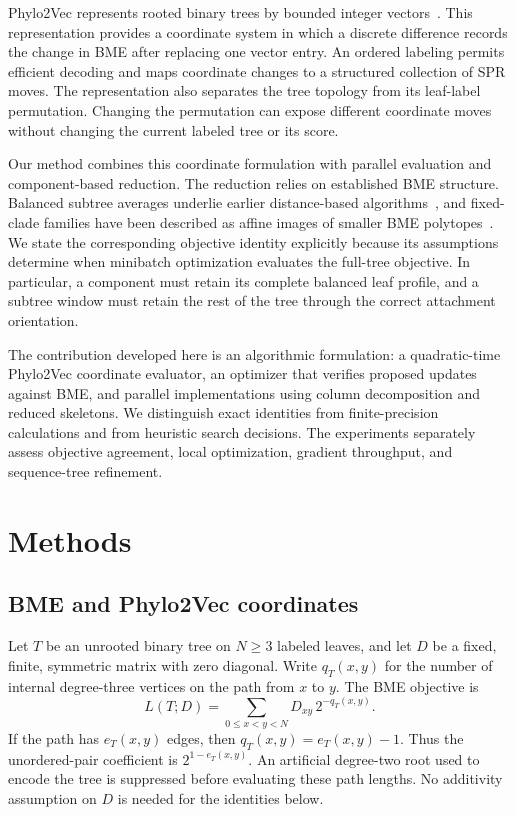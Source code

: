 \documentclass[11pt,a4paper]{article}
\makeatletter
\DeclareRobustCommand{\_}{\ifmmode\nfss@text{\textunderscore}\else\textunderscore\allowbreak\fi}
\theoremstyle{definition}
\makeatother
\begin{document}
Phylo2Vec represents rooted binary trees by bounded integer vectors~\cite{penn2024phylo2vec}.
This representation provides a coordinate system in which a discrete difference records the change in BME after replacing one vector entry.
An ordered labeling permits efficient decoding and maps coordinate changes to a structured collection of SPR moves.
The representation also separates the tree topology from its leaf-label permutation.
Changing the permutation can expose different coordinate moves without changing the current labeled tree or its score.

Our method combines this coordinate formulation with parallel evaluation and component-based reduction.
The reduction relies on established BME structure.
Balanced subtree averages underlie earlier distance-based algorithms~\cite{desper2002fast,desper2004theory}, and fixed-clade families have been described as affine images of smaller BME polytopes~\cite[Section~2.4]{haws2011optimality}.
We state the corresponding objective identity explicitly because its assumptions determine when minibatch optimization evaluates the full-tree objective.
In particular, a component must retain its complete balanced leaf profile, and a subtree window must retain the rest of the tree through the correct attachment orientation.

The contribution developed here is an algorithmic formulation: a quadratic-time Phylo2Vec coordinate evaluator, an optimizer that verifies proposed updates against BME, and parallel implementations using column decomposition and reduced skeletons.
We distinguish exact identities from finite-precision calculations and from heuristic search decisions.
The experiments separately assess objective agreement, local optimization, gradient throughput, and sequence-tree refinement.

\section{Methods}
\label{sec:math}

\subsection{BME and Phylo2Vec coordinates}

Let $T$ be an unrooted binary tree on $N\geq3$ labeled leaves, and let $D$ be a fixed, finite, symmetric matrix with zero diagonal.
Write $q_T(x,y)$ for the number of internal degree-three vertices on the path from $x$ to $y$.
The BME objective is
\begin{equation}
 L(T;D)=\sum_{0\leq x<y<N}D_{xy}\,2^{-q_T(x,y)}.
 \label{eq:pauplin}
\end{equation}
If the path has $e_T(x,y)$ edges, then $q_T(x,y)=e_T(x,y)-1$.
Thus the unordered-pair coefficient is $2^{1-e_T(x,y)}$.
An artificial degree-two root used to encode the tree is suppressed before evaluating these path lengths.
No additivity assumption on $D$ is needed for the identities below.
\end{document}
